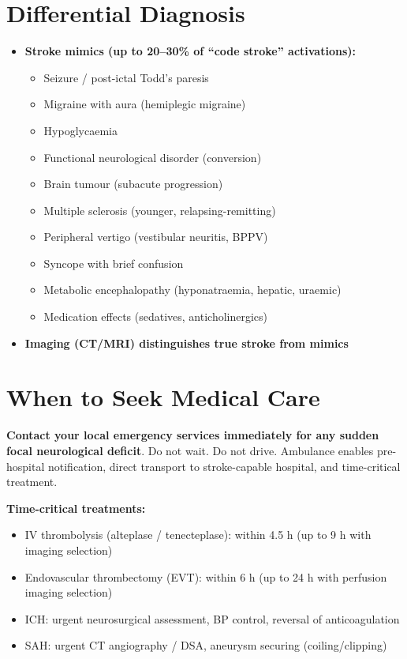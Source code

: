 \section*{Differential Diagnosis}
\begin{itemize}
    \item \textbf{Stroke mimics (up to 20--30\% of ``code stroke'' activations):}
    \begin{itemize}
        \item Seizure / post-ictal Todd's paresis
        \item Migraine with aura (hemiplegic migraine)
        \item Hypoglycaemia
        \item Functional neurological disorder (conversion)
        \item Brain tumour (subacute progression)
        \item Multiple sclerosis (younger, relapsing-remitting)
        \item Peripheral vertigo (vestibular neuritis, BPPV)
        \item Syncope with brief confusion
        \item Metabolic encephalopathy (hyponatraemia, hepatic, uraemic)
        \item Medication effects (sedatives, anticholinergics)
    \end{itemize}
    \item \textbf{Imaging (CT/MRI) distinguishes true stroke from mimics}
\end{itemize}

\section*{When to Seek Medical Care}
\textbf{Contact your local emergency services immediately for any sudden focal neurological deficit}. Do not wait. Do not drive. Ambulance enables pre-hospital notification, direct transport to stroke-capable hospital, and time-critical treatment.

\textbf{Time-critical treatments:}
\begin{itemize}
    \item IV thrombolysis (alteplase / tenecteplase): within 4.5 h (up to 9 h with imaging selection)
    \item Endovascular thrombectomy (EVT): within 6 h (up to 24 h with perfusion imaging selection)
    \item ICH: urgent neurosurgical assessment, BP control, reversal of anticoagulation
    \item SAH: urgent CT angiography / DSA, aneurysm securing (coiling/clipping)
\end{itemize}

